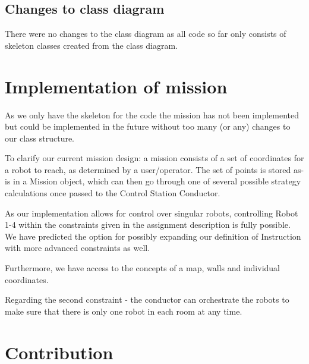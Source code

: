 \subsection{Changes to class diagram}
There were no changes to the class diagram as all code so far only consists of skeleton classes created from the class diagram.

\section{Implementation of mission}
As we only have the skeleton for the code the mission has not been implemented but could be implemented in the future without too many (or any) changes to our class structure.

To clarify our current mission design: a mission consists of a set of coordinates for a robot to reach, as determined by a user/operator. The set of points is stored as-is in a Mission object, which can then go through one of several possible strategy calculations once passed to the Control Station Conductor.

As our implementation allows for control over singular robots, controlling Robot 1-4 within the constraints given in the assignment description is fully possible. We have predicted the option for possibly expanding our definition of Instruction with more advanced constraints as well.

Furthermore, we have access to the concepts of a map, walls and individual coordinates.

Regarding the second constraint - the conductor can orchestrate the robots to make sure that there is only one robot in each room at any time.

\section{Contribution}

